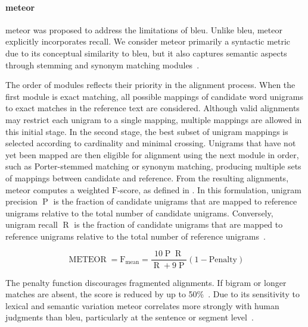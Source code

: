 
\paragraph{\acs{meteor}}
\ac{meteor} was proposed to address the limitations of \ac{bleu}. 
Unlike \ac{bleu}, \ac{meteor} explicitly incorporates recall. 
We consider \ac{meteor} primarily a syntactic metric due to its conceptual similarity to \ac{bleu}, but it also captures semantic aspects through stemming and synonym matching modules~\citep{kurt_pehlivanoglu_comparative_2024}. 

The order of modules reflects their priority in the alignment process. 
When the first module is exact matching, all possible mappings of candidate word unigrams to exact matches in the reference text are considered. 
Although valid alignments may restrict each unigram to a single mapping, multiple mappings are allowed in this initial stage. 
In the second stage, the best subset of unigram mappings is selected according to cardinality and minimal crossing. 
Unigrams that have not yet been mapped are then eligible for alignment using the next module in order, such as Porter-stemmed matching or synonym matching, producing multiple sets of mappings between candidate and reference. 
From the resulting alignments, \ac{meteor} computes a weighted $\mathrm{F}$-score, as defined in . 
In this formulation, unigram precision $\operatorname{P}$ is the fraction of candidate unigrams that are mapped to reference unigrams relative to the total number of candidate unigrams. 
Conversely, unigram recall $\operatorname{R}$ is the fraction of candidate unigrams that are mapped to reference unigrams relative to the total number of reference unigrams~\citep{banerjee_METEOR_2005}.

\begin{equation}
    \operatorname{METEOR} = \operatorname{F_{mean}} = \frac{10  \operatorname{P}  \operatorname{R}}{\operatorname{R} + 9  \operatorname{P}}  (1 - \mathrm{Penalty})
\label{eq:meteor}
\end{equation}

The penalty function discourages fragmented alignments.
If bigram or longer matches are absent, the score is reduced by up to 50\%~\citep{banerjee_METEOR_2005}. 
Due to its sensitivity to lexical and semantic variation \ac{meteor} correlates more strongly with human judgments than \ac{bleu}, particularly at the sentence or segment level~\citep{zhou_paraphrase_2021,kurt_pehlivanoglu_comparative_2024}.


